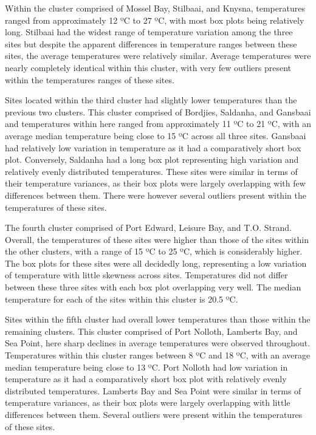 \documentclass[12pt,]{article}
\begin{document}
Within the cluster comprised of Mossel Bay, Stilbaai, and Knysna,
temperatures ranged from approximately 12 ºC to 27 ºC, with most box
plots being relatively long. Stilbaai had the widest range of
temperature variation among the three sites but despite the apparent
differences in temperature ranges between these sites, the average
temperatures were relatively similar. Average temperatures were nearly
completely identical within this cluster, with very few outliers present
within the temperatures ranges of these sites.

Sites located within the third cluster had slightly lower temperatures
than the previous two clusters. This cluster comprised of Bordjies,
Saldanha, and Gansbaai and temperatures within here ranged from
approximately 11 ºC to 21 ºC, with an average median temperature being
close to 15 ºC across all three sites. Gansbaai had relatively low
variation in temperature as it had a comparatively short box plot.
Conversely, Saldanha had a long box plot representing high variation and
relatively evenly distributed temperatures. These sites were similar in
terms of their temperature variances, as their box plots were largely
overlapping with few differences between them. There were however
several outliers present within the temperatures of these sites.

The fourth cluster comprised of Port Edward, Leisure Bay, and T.O.
Strand. Overall, the temperatures of these sites were higher than those
of the sites within the other clusters, with a range of 15 ºC to 25 ºC,
which is considerably higher. The box plots for these sites were all
decidedly long, representing a low variation of temperature with little
skewness across sites. Temperatures did not differ between these three
sites with each box plot overlapping very well. The median temperature
for each of the sites within this cluster is 20.5 ºC.

Sites within the fifth cluster had overall lower temperatures than those
within the remaining clusters. This cluster comprised of Port Nolloth,
Lamberts Bay, and Sea Point, here sharp declines in average temperatures
were observed throughout. Temperatures within this cluster ranges
between 8 ºC and 18 ºC, with an average median temperature being close
to 13 ºC. Port Nolloth had low variation in temperature as it had a
comparatively short box plot with relatively evenly distributed
temperatures. Lamberts Bay and Sea Point were similar in terms of
temperature variances, as their box plots were largely overlapping with
little differences between them. Several outliers were present within
the temperatures of these sites.
\end{document}
